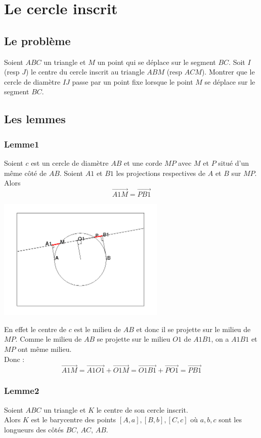 \documentclass[a4paper,11pt]{book}
\begin{document}
\section{Le cercle inscrit}
\subsection{Le probl\`eme}
Soient $ABC$ un triangle et $M$ un point qui se d\'eplace sur le segment $BC$.
Soit $I$ (resp $J$) le centre du cercle inscrit au triangle $ABM$ (resp $ACM$).
Montrer que le cercle de diam\`etre $IJ$ passe par un point fixe lorsque
le point $M$ se d\'eplace sur le segment $BC$.

\subsection{Les lemmes}
\subsubsection{Lemme1}
Soient $c$ est un cercle de diam\`etre $AB$ et une corde $MP$ avec $M$ et $P$ 
situ\'e d'un m\^eme c\^ot\'e de $AB$.
Soient $A1$ et $B1$ les projections respectives de $A$ et $B$ sur $MP$.\\
Alors 
$$\overrightarrow{A1M}=\overrightarrow{PB1}$$
\begin{center}\includegraphics[width=8cm]{inscrit1}\end{center}

En effet le centre de $c$ est le milieu de $AB$ et donc il se projette sur le 
milieu de $MP$. Comme le milieu de $AB$ se projette sur le 
milieu $O1$ de $A1B1$, on a $A1B1$ et $MP$ ont m\^eme milieu.\\
Donc  :
$$\overrightarrow{A1M}=\overrightarrow{A1O1}+\overrightarrow{O1M}=\overrightarrow{O1B1}+\overrightarrow{PO1}=\overrightarrow{PB1}$$

\subsubsection{Lemme2}
Soient $ABC$ un triangle et $K$ le centre de son cercle inscrit.\\
Alors $K$ est le barycentre des points $[A,a],[B,b],[C,c]$ o\`u $a,b,c$ sont 
les longueurs des c\^ot\'es $BC$, $AC$, $AB$.\\
\end{document}
